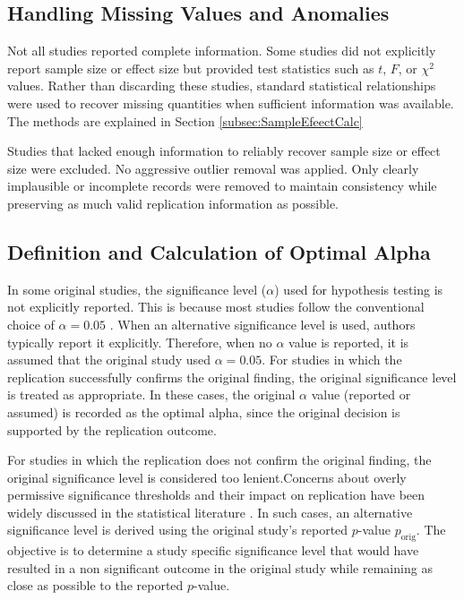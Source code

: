 {\subsection{Handling Missing Values and Anomalies}

Not all studies reported complete information. Some studies did not explicitly report sample size or effect size but provided test statistics such as $t$, $F$, or $\chi^2$ values. Rather than discarding these studies, standard statistical relationships were used to recover missing quantities when sufficient information was available. The methods are explained in Section \ref{subsec:SampleEfeectCalc}

Studies that lacked enough information to reliably recover sample size or effect size were excluded. No aggressive outlier removal was applied. Only clearly implausible or incomplete records were removed to maintain consistency while preserving as much valid replication information as possible.

\subsection{Definition and Calculation of Optimal Alpha}
\label{subsec:OAlphaCalculation}
In some original studies, the significance level ($\alpha$) used for hypothesis testing is not explicitly reported. This is because most studies follow the conventional choice of $\alpha = 0.05$ \cite{Kwak2023}. When an alternative significance level is used, authors typically report it explicitly. Therefore, when no $\alpha$ value is reported, it is assumed that the original study used $\alpha = 0.05$.
For studies in which the replication successfully confirms the original finding, the original significance level is treated as appropriate. In these cases, the original $\alpha$ value (reported or assumed) is recorded as the optimal alpha, since the original decision is supported by the replication outcome.

For studies in which the replication does not confirm the original finding, 
the original significance level is considered too lenient.Concerns 
about overly permissive significance thresholds and their impact on 
replication have been widely discussed in the statistical literature 
\cite{Benjamin2018, WassersteinLazar2016}. In such cases, 
an alternative significance level is derived using the original study's 
reported $p$-value $p_{\text{orig}}$. The objective is to determine a 
study specific significance level that would have resulted in a 
non significant outcome in the original study while remaining as close as 
possible to the reported $p$-value.

}
